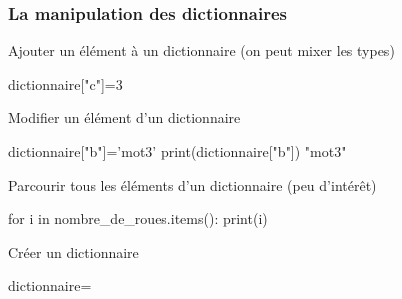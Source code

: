 \begin{frame}[fragile]
\frametitle{La manipulation des dictionnaires}

\begin{minipage}[t]{0.38\linewidth}
Ajouter un élément à un dictionnaire (on peut mixer les types)
\end{minipage}\hfill
\begin{minipage}[t]{0.58\linewidth}
\vspace{-0.5cm}
\begin{GrayBox}[0.85\textwidth]
\begin{verbatimtab}[3]
dictionnaire["c"]=3
\end{verbatimtab}
\end{GrayBox}
\end{minipage}

\begin{minipage}[t]{0.38\linewidth}
Modifier un élément d'un dictionnaire
\end{minipage}\hfill
\begin{minipage}[t]{0.58\linewidth}
\vspace{-0.5cm}
\begin{GrayBox}[0.85\textwidth]
\begin{verbatimtab}[3]
dictionnaire["b"]='mot3'
print(dictionnaire["b"])
	"mot3"
\end{verbatimtab}
\end{GrayBox}
\end{minipage}

\begin{minipage}[t]{0.38\linewidth}
Parcourir tous les éléments d'un dictionnaire (peu d'intérêt)
\end{minipage}\hfill
\begin{minipage}[t]{0.58\linewidth}
\vspace{-0.5cm}
\begin{GrayBox}[0.85\textwidth]
\begin{verbatimtab}[3]
for i in nombre_de_roues.items():
    print(i)
\end{verbatimtab}
\end{GrayBox}
\end{minipage}

\begin{minipage}[t]{0.38\linewidth}
Créer un dictionnaire
\end{minipage}\hfill
\begin{minipage}[t]{0.58\linewidth}
\vspace{-0.5cm}
\begin{GrayBox}[0.85\textwidth]
\begin{verbatimtab}[3]
dictionnaire={}
\end{verbatimtab}
\end{GrayBox}
\end{minipage}
\end{frame}


